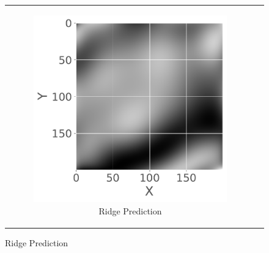 \begin{figure}[!htbp]
\begin{tabular}{cc}
\begin{subfigure}[b]{0.45\textwidth}
            \includegraphics[width=\textwidth]{latex/figures/ridge_terrain1_prediction.pdf}
            \caption{Ridge Prediction}
            \label{fig:ridge}
        \end{subfigure} \\
        

\end{tabular}
\end{figure}
